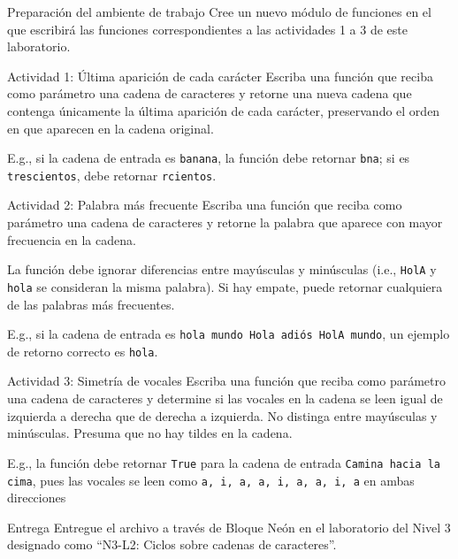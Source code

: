 \documentclass{ip-lab}
\begin{document}
\maketitle

\begin{sectionbox}{Preparación del ambiente de trabajo}
  Cree un nuevo módulo de funciones en el que escribirá las funciones correspondientes a las actividades 1 a 3 de este laboratorio.
\end{sectionbox}


\begin{sectionbox}{Actividad 1: Última aparición de cada carácter}
Escriba una función que reciba como parámetro una cadena de caracteres y retorne una nueva cadena que contenga únicamente la última aparición de cada carácter, preservando el orden en que aparecen en la cadena original.

E.g., si la cadena de entrada es \texttt{\textquotedbl banana\textquotedbl}, la función debe retornar \texttt{\textquotedbl bna\textquotedbl}; si es \texttt{\textquotedbl trescientos\textquotedbl}, debe retornar \texttt{\textquotedbl rcientos\textquotedbl}.


\end{sectionbox}

\begin{sectionbox}{Actividad 2: Palabra más frecuente}
Escriba una función que reciba como parámetro una cadena de caracteres y retorne la palabra que aparece con mayor frecuencia en la cadena.

La función debe ignorar diferencias entre mayúsculas y minúsculas (i.e., \texttt{\textquotedbl HolA\textquotedbl} y \texttt{\textquotedbl hola\textquotedbl} se consideran la misma palabra). Si hay empate, puede retornar cualquiera de las palabras más frecuentes.

E.g., si la cadena de entrada es \texttt{\textquotedbl hola mundo Hola adiós HolA mundo\textquotedbl}, un ejemplo de retorno correcto es \texttt{\textquotesingle hola\textquotesingle}.
\end{sectionbox}

\pagebreak

\begin{sectionbox}{Actividad 3: Simetría de vocales}
Escriba una función que reciba como parámetro una cadena de caracteres y determine si las vocales en la cadena se leen igual de izquierda a derecha que de derecha a izquierda. No distinga entre mayúsculas y minúsculas. Presuma que no hay tildes en la cadena.

E.g., la función debe retornar \texttt{True} para la cadena de entrada \texttt{\textquotedbl Camina hacia la cima\textquotedbl}, pues las vocales se leen como \texttt{a, i, a, a, i, a, a, i, a} en ambas direcciones
\end{sectionbox}

\begin{sectionbox}{Entrega}
Entregue el archivo a través de Bloque Neón en el laboratorio del Nivel 3 designado como ``N3-L2: Ciclos sobre cadenas de caracteres''.
\end{sectionbox}
\end{document}
